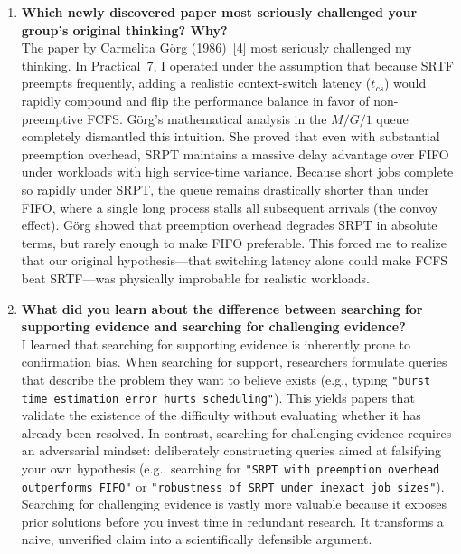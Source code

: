 \documentclass[11pt]{article}
\begin{document}
\begin{enumerate}[leftmargin=1.5em, itemsep=1.0em]

    \item \textbf{Which newly discovered paper most seriously challenged your group's original thinking? Why?} \\
    The paper by Carmelita G{\"o}rg (1986)~[4] most seriously challenged my thinking. In Practical~7, I operated under the assumption that because SRTF preempts frequently, adding a realistic context-switch latency ($t_{cs}$) would rapidly compound and flip the performance balance in favor of non-preemptive FCFS. G{\"o}rg's mathematical analysis in the $M/G/1$ queue completely dismantled this intuition. She proved that even with substantial preemption overhead, SRPT maintains a massive delay advantage over FIFO under workloads with high service-time variance. Because short jobs complete so rapidly under SRPT, the queue remains drastically shorter than under FIFO, where a single long process stalls all subsequent arrivals (the convoy effect). G{\"o}rg showed that preemption overhead degrades SRPT in absolute terms, but rarely enough to make FIFO preferable. This forced me to realize that our original hypothesis—that switching latency alone could make FCFS beat SRTF—was physically improbable for realistic workloads.

    \item \textbf{What did you learn about the difference between searching for supporting evidence and searching for challenging evidence?} \\
    I learned that searching for supporting evidence is inherently prone to confirmation bias. When searching for support, researchers formulate queries that describe the problem they want to believe exists (e.g., typing \texttt{"burst time estimation error hurts scheduling"}). This yields papers that validate the existence of the difficulty without evaluating whether it has already been resolved. In contrast, searching for challenging evidence requires an adversarial mindset: deliberately constructing queries aimed at falsifying your own hypothesis (e.g., searching for \texttt{"SRPT with preemption overhead outperforms FIFO"} or \texttt{"robustness of SRPT under inexact job sizes"}). Searching for challenging evidence is vastly more valuable because it exposes prior solutions before you invest time in redundant research. It transforms a naive, unverified claim into a scientifically defensible argument.


\end{enumerate}
\end{document}
